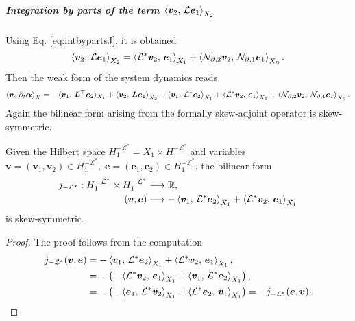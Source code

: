 \subparagraph{Integration by parts of the term $\inner[X_2]{\bm{v}_2}{\mathcal{L}\bm{e}_1}$}
Using Eq. \eqref{eq:intbypartsJ}, it is obtained 
\begin{equation}
\inner[X_2]{\bm{v}_2}{\mathcal{L}\bm{e}_1} = \inner[X_1]{\mathcal{L}^*\bm{v}_2}{\bm{e}_1} + \inner[X_\partial]{\mathcal{N}_{\partial, 2} \bm{v}_2}{\mathcal{N}_{\partial, 1} \bm{e}_1}.
\end{equation}
Then the weak form of the system dynamics  reads 
\begin{equation}\label{eq:weak_dyn_intJ2}
\inner[X]{\bm{v}}{\partial_t \bm{\alpha}} =   -  \langle{\bm{v}_1}, \,{\bm{L}^\top \bm{e}_2}\rangle_{X_1} + \inner[X_2]{\bm{v}_2}{\bm{L}\bm{e}_1} -\inner[X_1]{\bm{v}_1}{\mathcal{L}^*\bm{e}_2} + \inner[X_1]{\mathcal{L}^*\bm{v}_2}{\bm{e}_1} + \inner[X_\partial]{\mathcal{N}_{\partial, 2} \bm{v}_2}{\mathcal{N}_{\partial, 1} \bm{e}_1}. 
\end{equation}
Again the bilinear form arising from the formally skew-adjoint operator is skew-symmetric.
\begin{proposition}
	Given the Hilbert space $H^{-\mathcal{L}^*}_1 = X_1 \times H^{-\mathcal{L}^*}$ and variables $\bm{v} = (\bm{v}_1, \bm{v}_2) \in H^{-\mathcal{L}^*}_1, \; \bm{e} = (\bm{e}_1, \bm{e}_2) \in H^{-\mathcal{L}^*}_1$, the bilinear form 
	\begin{equation*}
	\begin{aligned}
	j_{-\mathcal{L}^*}: H^{-\mathcal{L}^*}_1 \times H^{-\mathcal{L}^*}_1 &\longrightarrow \mathbb{R}, \\
	(\bm{v}, \bm{e}) &\longrightarrow -\inner[X_1]{\bm{v}_1}{\mathcal{L}^*\bm{e}_2} + \inner[X_1]{\mathcal{L}^*\bm{v}_2}{\bm{e}_1}
	\end{aligned}
	\end{equation*}
	is skew-symmetric.
	\begin{proof}
		The proof follows from the computation
		\begin{equation*}
		\begin{aligned}
		j_{-\mathcal{L}^*}(\bm{v}, \bm{e}) &= -\inner[X_1]{\bm{v}_1}{\mathcal{L}^*\bm{e}_2} + \inner[X_1]{\mathcal{L}^*\bm{v}_2}{\bm{e}_1}, \\
		&= - \left(-\inner[X_1]{\mathcal{L}^*\bm{v}_2}{\bm{e}_1} + \inner[X_1]{\bm{v}_1}{\mathcal{L}^*\bm{e}_2}\right), \\
		&= - \left(-\inner[X_1]{\bm{e}_1}{\mathcal{L}^*\bm{v}_2} + \inner[X_1]{\mathcal{L}^*\bm{e}_2}{\bm{v}_1}\right) = - j_{-\mathcal{L}^*}(\bm{e}, \bm{v}).
		\end{aligned}
		\end{equation*}
	\end{proof}
\end{proposition}

